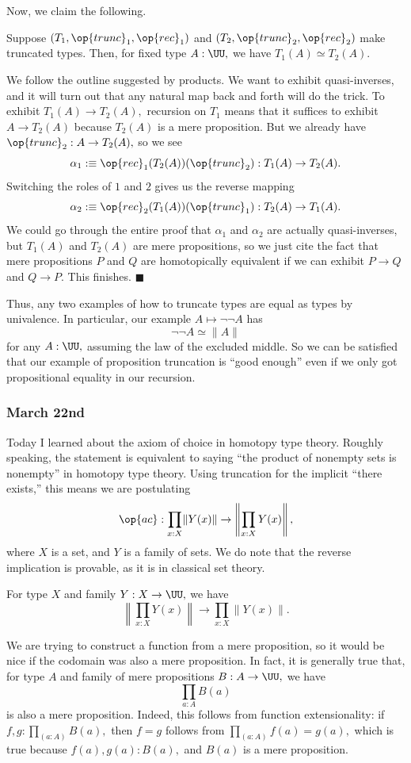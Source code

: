 Now, we claim the following.
\begin{proposition}
    Suppose $(T_1,\op{trunc}_1,\op{rec}_1)$ and $(T_2,\op{trunc}_2,\op{rec}_2)$ make truncated types. Then, for fixed type $A:\UU,$ we have $T_1(A)\simeq T_2(A).$
\end{proposition}
We follow the outline suggested by products. We want to exhibit quasi-inverses, and it will turn out that any natural map back and forth will do the trick. To exhibit $T_1(A)\to T_2(A),$ recursion on $T_1$ means that it suffices to exhibit $A\to T_2(A)$ because $T_2(A)$ is a mere proposition. But we already have $\op{trunc}_2:A\to T_2(A),$ so we see
\[\alpha_1:\equiv\op{rec}_1(T_2(A))(\op{trunc}_2):T_1(A)\to T_2(A).\]
Switching the roles of $1$ and $2$ gives us the reverse mapping
\[\alpha_2:\equiv\op{rec}_2(T_1(A))(\op{trunc}_1):T_2(A)\to T_1(A).\]
We could go through the entire proof that $\alpha_1$ and $\alpha_2$ are actually quasi-inverses, but $T_1(A)$ and $T_2(A)$ are mere propositions, so we just cite the fact that mere propositions $P$ and $Q$ are homotopically equivalent if we can exhibit $P\to Q$ and $Q\to P.$ This finishes. $\blacksquare$

Thus, any two examples of how to truncate types are equal as types by univalence. In particular, our example $A\mapsto\lnot\lnot A$ has
\[\lnot\lnot A\simeq\lVert A\rVert\]
for any $A:\UU,$ assuming the law of the excluded middle. So we can be satisfied that our example of proposition truncation is ``good enough'' even if we only got propositional equality in our recursion.

\subsubsection{March 22nd}
Today I learned about the axiom of choice in homotopy type theory. Roughly speaking, the statement is equivalent to saying ``the product of nonempty sets is nonempty'' in homotopy type theory. Using truncation for the implicit ``there exists,'' this means we are postulating
\[\op{ac}:\prod_{x:X}\lVert Y(x)\rVert\to\left\lVert\prod_{x:X}Y(x)\right\rVert,\]
where $X$ is a set, and $Y$ is a family of sets. We do note that the reverse implication is provable, as it is in classical set theory.
\begin{proposition}
    For type $X$ and family $Y:X\to\UU,$ we have
    \[\left\lVert\prod_{x:X}Y(x)\right\rVert\to\prod_{x:X}\left\lVert Y(x)\right\rVert.\]
\end{proposition}
We are trying to construct a function from a mere proposition, so it would be nice if the codomain was also a mere proposition. In fact, it is generally true that, for type $A$ and family of mere propositions $B:A\to\UU,$ we have
\[\prod_{a:A}B(a)\]
is also a mere proposition. Indeed, this follows from function extensionality: if $f,g:\prod_{(a:A)}B(a),$ then $f=g$ follows from $\prod_{(a:A)}f(a)=g(a),$ which is true because $f(a),g(a):B(a),$ and $B(a)$ is a mere proposition.

